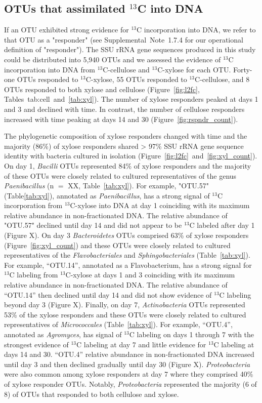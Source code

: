 \subsection{OTUs that assimilated $^{13}$C into DNA} \label{responders}
If an OTU exhibited strong evidence for $^{13}$C incorporation into DNA, we
refer to that OTU as a "responder" (see Supplemental Note 1.7.4 for our
operational definition of "responder"). The SSU rRNA gene sequences produced in
this study could be distributed into 5,940 OTUs and we assessed the evidence of
$^{13}$C incorporation into DNA from $^{13}$C-cellulose and
$^{13}$C-xylose for each OTU. Forty-one OTUs responded to $^{13}$C-xylose,
55 OTUs responded to $^{13}$C-cellulose, and 8 OTUs 
responded to both xylose and cellulose (Figure~\ref{fig:l2fc},
Tables~{tab:cell}~and~\ref{tab:xyl}). The number of xylose responders
peaked at days 1 and 3 and declined with time. In contrast, the number of
cellulose responders increased with time peaking at days 14 and 30
(Figure~\ref{fig:rspndr_count}). 

The phylogenetic composition of xylose responders changed with time and the
majority (86\%) of xylose responders shared > 97\% SSU rRNA gene sequence
identity with bacteria cultured in isolation
(Figure~\ref{fig:l2fc}~and~\ref{fig:xyl_count}). On day 1, \textit{Bacilli}
OTUs represented 84\% of xylose responders and the majority of these OTUs were
closely related to cultured representatives of the genus \textit{Paenibacillus}
(n $=$ XX, Table~\ref{tab:xyl}). For example, "OTU.57" (Table\ref{tab:xyl}),
annotated as \textit{Paenibacillus}, has a strong signal of $^{13}$C
incorporation from $^{13}$C-xylose into DNA at day 1 coinciding with its
maximum relative abundance in non-fractionated DNA. The relative abundance
of "OTU.57" declined until day 14 and did not appear to be $^{13}$C
labeled after day 1 (Figure X). On day 3 \textit{Bacteroidetes} OTUs
comprised 63\% of xylose responders (Figure~\ref{fig:xyl_count}) and these
OTUs were closely related to cultured representatives of the
\textit{Flavobacteriales} and \textit{Sphingobacteriales}
(Table~\ref{tab:xyl}). For example, ``OTU.14'', annotated as
a Flavobacterium, has a strong signal for $^{13}$C labeling from
$^{13}$C-xylose at days 1 and 3 coinciding with its maximum relative
abundance in non-fractionated DNA. The relative abundance of ``OTU.14''
then declined until day 14 and did not show evidence of $^{13}$C labeling
beyond day 3 (Figure X). Finally, on day 7, \textit{Actinobacteria} OTUs
represented 53\% of the xylose responders and these OTUs were closely
related to cultured representatives of \textit{Micrococcales}
(Table~\ref{tab:xyl}). For example, ``OTU.4'', annotated as
\textit{Agromyces}, has signal of $^{13}$C labeling on days 1 through
7 with the strongest evidence of $^{13}$C labeling at day
7 and little evidence for $^{13}$C labeling at days 14 and 30. ``OTU.4''
relative abundance in non-fractionated DNA increased until day 3 and
then declined gradually until day 30 (Figure X). \textit{Proteobacteria} were
also common among xylose responders at day 7 where they comprised 40\% of
xylose responder OTUs. Notably, \textit{Proteobacteria} represented the
majority (6 of 8) of OTUs that responded to both cellulose and xylose. 

